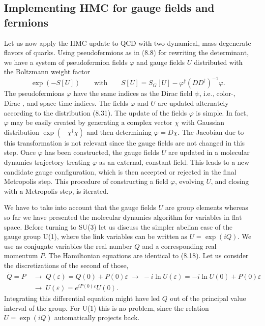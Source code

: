 \subsection{Implementing HMC for gauge fields and fermions}

Let us now apply the HMC-update to QCD with two dynamical, mass-degenerate
flavors of quarks. Using pseudofermions as in (8.8) for rewriting the
determinant, we have a system of pseudofermion fields $\varphi$ and gauge
fields $U$ distributed with the Boltzmann weight factor
\begin{equation}
\exp(-S[U]) \qquad \text{with} \qquad S[U] = S_G[U] - \varphi^\dagger(DD^\dagger)^{-1}\varphi.
\end{equation}
The pseudofermions $\varphi$ have the same indices as the Dirac field $\psi$,
i.e., color-, Dirac-, and space-time indices. The fields $\varphi$ and $U$ are
updated alternately according to the distribution (8.31).
The update of the fields $\varphi$ is simple. In fact, $\varphi$ may be easily
created by generating a complex vector $\chi$ with Gaussian distribution
$\exp(-\chi^\dagger\chi)$ and then determining $\varphi = D\chi$. The Jacobian
due to this transformation is not relevant since the gauge fields are not
changed in this step.
Once $\varphi$ has been constructed, the gauge fields $U$ are updated in a
molecular dynamics trajectory treating $\varphi$ as an external, constant
field. This leads to a new candidate gauge configuration, which is then
accepted or rejected in the final Metropolis step. This procedure of
constructing a field $\varphi$, evolving $U$, and closing with a Metropolis
step, is iterated.

We have to take into account that the gauge fields $U$ are group elements
whereas so far we have presented the molecular dynamics algorithm for variables
in flat space. Before turning to SU(3) let us discuss the simpler abelian case
of the gauge group U(1), where the link variables can be written as
$U = \exp(iQ)$. We use as conjugate variables the real number $Q$ and a
corresponding real momentum $P$. The Hamiltonian equations are identical to
(8.18). Let us consider the discretizations of the second of those,
\begin{equation}
\begin{aligned}
\dot{Q} = P \;&\to\; Q(\varepsilon) = Q(0) + P(0)\varepsilon
\;\to\; -i\ln U(\varepsilon) = -i\ln U(0) + P(0)\varepsilon\\
&\to\; U(\varepsilon) = e^{iP(0)\varepsilon}U(0).
\end{aligned}
\end{equation}
Integrating this differential equation might have led $Q$ out of the principal
value interval of the group. For U(1) this is no problem, since the relation
$U = \exp(iQ)$ automatically projects back.

